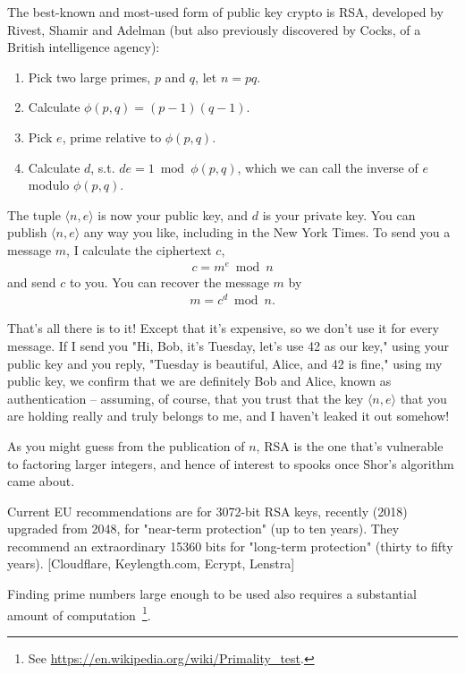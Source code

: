 \documentclass[%
 aip,
 jmp,%
 amsmath,amssymb,
 reprint,%
]{revtex4-1}
\begin{document}
The best-known and most-used form of public key crypto is RSA, developed by Rivest, Shamir and Adelman (but also previously discovered by Cocks, of a British intelligence agency):

\begin{enumerate}
\item Pick two large primes, $p$ and $q$, let $n = pq$.
\item Calculate $\phi(p,q) = (p-1)(q-1)$.
\item Pick $e$, prime relative to $\phi(p,q)$.
\item Calculate $d$, s.t. $de = 1 \bmod \phi(p,q)$,
  which we can call the inverse of $e$ modulo $\phi(p,q)$.
\end{enumerate}

The tuple $\langle n,e\rangle$ is now your public key, and $d$ is your private key.
You can publish $\langle n,e\rangle$ any way you like, including in the New York
Times. To send you a message $m$, I calculate the ciphertext $c$,
\begin{align}
c = m^e \bmod n
\end{align}
and send $c$ to you.  You can recover the message $m$ by
\begin{align}
m = c^d \bmod n.
\end{align}

That's all there is to it!  Except that it's expensive, so we don't
use it for every message.  If I send you "Hi, Bob, it's Tuesday, let's
use 42 as our key," using your public key and you reply, "Tuesday is
beautiful, Alice, and 42 is fine," using my public key, we confirm
that we are definitely Bob and Alice, known as authentication --
assuming, of course, that you trust that the key $\langle n,e\rangle$
that you are holding really and truly belongs to me, and I haven't
leaked it out somehow!

As you might guess from the publication of $n$, RSA is the one that's
vulnerable to factoring larger integers, and hence of interest to
spooks once Shor's algorithm came about.

Current EU recommendations are for 3072-bit RSA keys, recently (2018)
upgraded from 2048, for "near-term protection" (up to ten years).
They recommend an extraordinary 15360 bits for "long-term protection"
(thirty to fifty years). [Cloudflare, Keylength.com, Ecrypt, Lenstra]

Finding prime numbers large enough to be used also requires a
substantial amount of computation~\footnote{See
  \url{https://en.wikipedia.org/wiki/Primality_test}.}.
\end{document}
